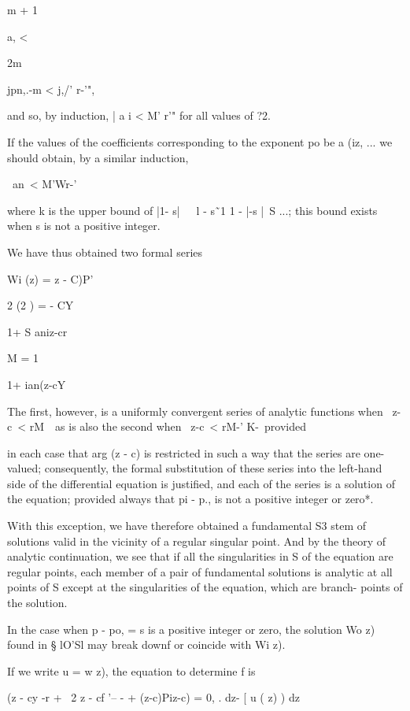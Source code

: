 m + 1

a, <

2m

jpn,.-m < j,/' r-'",

and so, by induction, | a i < M' r'" for all values of ?2.

If the values of the coefficients corresponding to the exponent po be
a (iz, ... we should obtain, by a similar induction,

\ an\ < M'Wr-'\

where k is the upper bound of |1- s|~\ \ l - s\~\ 1 1 - |-s |~S ...;
this bound exists when s is not a positive integer.

We have thus obtained two formal series

Wi (z) = z - C)P'

 2 (2 ) = - CY

1+ S aniz-cr

M = 1

1+ ian(z-cY

The first, however, is a uniformly convergent series of analytic
functions when \ z-c\ < rM~\ as is also the second when \ z-c\ < rM-'
K-\ provided

%
%

in each case that arg (z - c) is restricted in such a way that the
series are one-valued; consequently, the formal substitution of these
series into the left-hand side of the differential equation is
justified, and each of the series is a solution of the equation;
provided always that pi - p., is not a positive integer or zero*.

With this exception, we have therefore obtained a fundamental S3 stem
of solutions valid in the vicinity of a regular singular point. And by
the theory of analytic continuation, we see that if all the
singularities in S of the equation are regular points, each member of
a pair of fundamental solutions is analytic at all points of S except
at the singularities of the equation, which are branch- points of the
solution.


In the case when p - po, = s is a positive integer or zero, the
solution Wo z) found in § lO'Sl may break downf or coincide with Wi
z).

If we write u = w z), the equation to determine f is

(z - cy -r + \ 2 z - cf '-- - + (z-c)Piz-c) = 0, . dz- [ u ( z) ) dz

